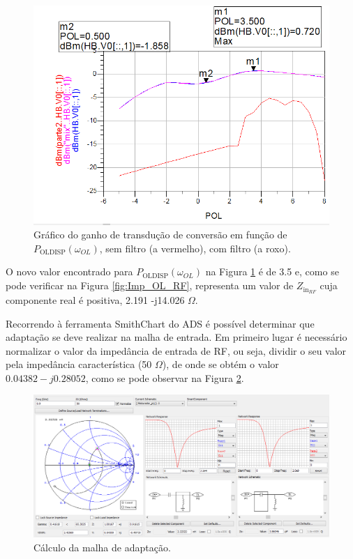 \documentclass[11pt]{article}
\numberwithin{equation}{section}
\begin{document}
\begin{figure}[h]
\centering
\includegraphics[keepaspectratio=true, scale=0.45]{exps/GT_20}
\vspace{-0.5em}
\caption{Gráfico do ganho de transdução de conversão em função de $ P_{\text{OLDISP}}\left(\omega_{OL}\right) $, sem filtro (a vermelho), com filtro (a roxo).}
\vspace{-0.8em}
\label{fig:GT_20}
\end{figure}

O novo valor encontrado para $ P_{\text{OLDISP}}\left(\omega_{OL}\right) $ na Figura \ref{fig:GT_20} é de 3.5 e, como se pode verificar na Figura \ref{fig:Imp_OL_RF}, representa um valor de $ Z_{\text{in}_{RF}} $ cuja componente real é positiva, 2.191 -j14.026 $\Omega $.

Recorrendo à ferramenta SmithChart do ADS é possível determinar que adaptação se deve realizar na malha de entrada. Em primeiro lugar é necessário normalizar o valor da impedância de entrada de RF, ou seja, dividir o seu valor pela impedância característica (50 $\Omega$), de onde se obtém o valor $0.04382 -j0.28052$, como se pode observar na Figura \ref{fig:M_adapt}.

\begin{figure}[h]
\centering
\includegraphics[keepaspectratio=true, scale=0.50]{exps/M_adapt}
\vspace{-0.5em}
\caption{Cálculo da malha de adaptação.}
\vspace{-0.8em}
\label{fig:M_adapt}
\end{figure}
\end{document}
